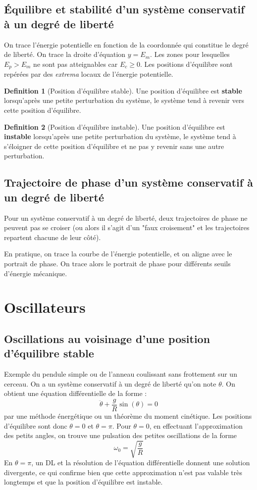 \documentclass[french]{book}
\theoremstyle{plain}
\theoremstyle{definition}
\newtheorem{dfn}{Definition}
\theoremstyle{remark}
\begin{document}
\subsection{Équilibre et stabilité d'un système conservatif à un degré de liberté}
On trace l'énergie potentielle en fonction de la coordonnée qui constitue le degré de liberté. On trace la droite d'équation $y=E_m$. Les zones pour lesquelles $E_p>E_m$ ne sont pas atteignables car $E_c\geqslant0$. Les positions d'équilibre sont repérées par des \textit{extrema} locaux de l'énergie potentielle.
\begin{dfn}[Position d'équilibre stable]
	Une position d'équilibre est \textbf{stable} lorsqu'après une petite perturbation du système, le système tend à revenir vers cette position d'équilibre.
\end{dfn}
\begin{dfn}[Position d'équilibre instable]
	Une position d'équilibre est \textbf{instable} lorsqu'après une petite perturbation du système, le système tend à s'éloigner de cette position d'équilibre et ne pas y revenir sans une autre perturbation.
\end{dfn}
\subsection{Trajectoire de phase d'un système conservatif à un degré de liberté}
Pour un système conservatif à un degré de liberté, deux trajectoires de phase ne peuvent pas se croiser (ou alors il s'agit d'un "faux croisement" et les trajectoires repartent chacune de leur côté). \\ \par En pratique, on trace la courbe de l'énergie potentielle, et on aligne avec le portrait de phase. On trace alors le portrait de phase pour différents seuils d'énergie mécanique.
\section{Oscillateurs}
\subsection{Oscillations au voisinage d'une position d'équilibre stable}
Exemple du pendule simple ou de l'anneau coulissant sans frottement sur un cerceau. On a un système conservatif à un degré de liberté qu'on note $\theta$. On obtient une équation différentielle de la forme : $$\ddot{\theta}+\frac{g}{R}\sin(\theta)=0$$ par une méthode énergétique ou un théorème du moment cinétique. Les positions d'équilibre sont donc $\theta=0$ et $\theta=\pi$. Pour $\theta=0$, en effectuant l'approximation des petits angles, on trouve une pulsation des petites oscillations de la forme $$\omega_0=\sqrt{\frac{g}{R}}$$ En $\theta=\pi$, un DL et la résolution de l'équation différentielle donnent une solution divergente, ce qui confirme bien que cette approximation n'est pas valable très longtemps et que la position d'équilibre est instable.
\end{document}
